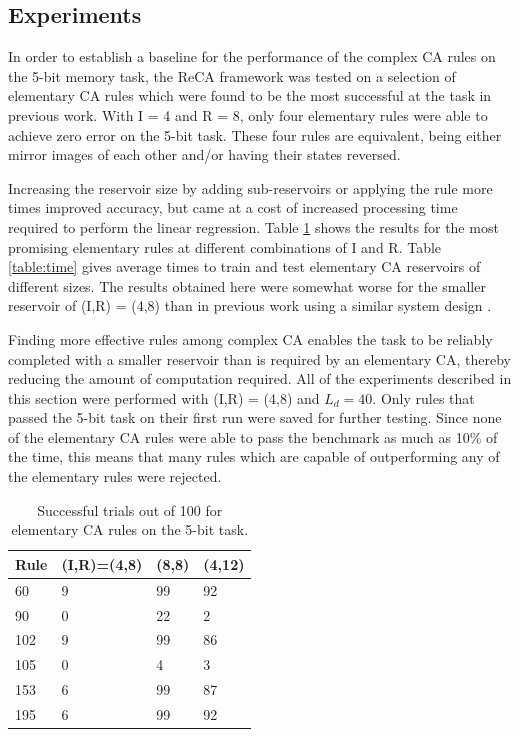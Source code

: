 \documentclass{facconf}
\begin{document}
\begin{multicols}{2}
\section{Experiments}\label{experiment}
In order to establish a baseline for the performance of the complex CA rules on 
the 5-bit memory task, the ReCA framework was tested on a selection of 
elementary CA rules which were found to be the most successful at the task in 
previous work\cite{yilmaz2014reservoir}\cite{bye2016investigation}. With I = 4 
and R = 8, only four elementary rules were able to achieve zero error on the 
5-bit task. These four rules are equivalent, being either mirror images of each 
other and/or having their states reversed.\par Increasing the reservoir size by 
adding sub-reservoirs or applying the rule more times improved accuracy, but 
came at a cost of increased processing time required to perform the linear 
regression.  Table \ref{table:elementary} shows the results for the most 
promising elementary rules at different combinations of I and R.  Table 
\ref{table:time} gives average times to train and test elementary CA reservoirs 
of different sizes. The results obtained here were somewhat worse for the 
smaller reservoir of (I,R) = (4,8) than in previous work using a similar system 
design  
\cite{bye2016investigation}\cite{yilmaz2014reservoir}\cite{nichele2017reservoir}.  
\par Finding more effective rules among complex CA enables the task to be 
reliably completed with a smaller reservoir than is required by an elementary 
CA, thereby reducing the amount of computation required. All of the experiments 
described in this section were performed with (I,R) = (4,8) and $L_{d} = 40$.  
Only rules that passed the 5-bit task on their first run were saved for further 
testing. Since none of the elementary CA rules were able to pass the benchmark 
as much as 10\% of the time, this means that many rules which are capable of 
outperforming any of the elementary rules were rejected. 


\begin{table}[H]
\begin{tabular}{|l|l|l|l|}
\hline
Rule & (I,R)=(4,8) & (8,8) & (4,12) \\ \hline
60 & 9 & 99 & 92 \\ \hline
90 & 0 & 22 & 2  \\ \hline
102 & 9 & 99 & 86 \\ \hline
105 & 0 & 4 & 3 \\ \hline
153 & 6 & 99 & 87 \\ \hline
195 & 6 & 99 & 92 \\ \hline
\end{tabular}
\caption{Successful trials out of 100 for elementary CA rules on the 5-bit 
    task.}
\label{table:elementary}
\end{table}


\end{multicols}
\end{document}
